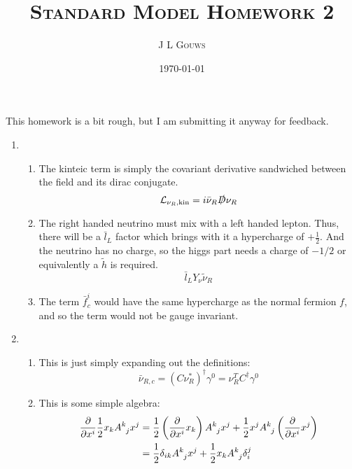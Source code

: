 \documentclass[12pt,a4]{article}
\title{
\textsc{Standard Model Homework 2}
}
\author{\textsc{J L Gouws}
}
\date{\today
\\[1cm]}
\begin{document}
\thispagestyle{empty}

\maketitle

This homework is a bit rough, but I am submitting it anyway for feedback.
\begin{enumerate}
  \item
    \begin{enumerate}
      \item
        The kinteic term is simply the covariant derivative sandwiched between the field and its dirac conjugate.
        \begin{equation*}
          \mathcal{L}_{\nu_R, \text{kin}} = i\bar{\nu}_R \slashed{D} \nu_R
        \end{equation*}
      \item
        The right handed neutrino must mix with a left handed lepton.
        Thus, there will be a $\bar{l}_L$ factor which brings with it a hypercharge of $+\frac{1}{2}$.
        And the neutrino has no charge, so the higgs part needs a charge of $-1/2$ or equivalently a $\tilde{h}$ is required.
        \begin{equation*}
          \bar{l}_L Y_\nu \tilde \nu_R
        \end{equation*}
      \item
        The term $\bar{f}^i_{c}$ would have the same hypercharge as the normal fermion $f$, and so the term would not be gauge invariant.
    \end{enumerate}
  \item
    \begin{enumerate}
      \item
        This is just simply expanding out the definitions:
        \begin{equation*}
          \bar{\nu}_{R, c} = \left(C \nu_R^*\right)^\dagger \gamma^0 =  \nu_R^T C^\dagger \gamma^0
        \end{equation*}
      \item
        This is some simple algebra:
        \begin{align*}
          \frac{\partial}{\partial x^i} \frac{1}{2} x_k \tensor{A}{^k_j} x^j &= \frac{1}{2} \left(\frac{\partial}{\partial x^i}  x_k \right) \tensor{A}{^k_j} x^j + \frac{1}{2}  x^j \tensor{A}{^k_j} \left(\frac{\partial}{\partial x^i} x^j \right)\\
                                                                             &= \frac{1}{2} \delta_{ik} \tensor{A}{^k_j} x^j + \frac{1}{2}  x_k \tensor{A}{^k_j} \delta^{j}_{i}\\

\end{align*}
\end{enumerate}
\end{enumerate}
\end{document}
